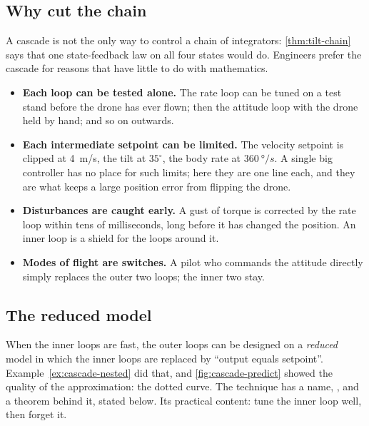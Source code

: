 \subsection{Why cut the chain}
A cascade is not the only way to control a chain of integrators: \cref{thm:tilt-chain} says that one state-feedback law on all four states would do. Engineers prefer the cascade for reasons that have little to do with mathematics.
\begin{itemize}
  \item \textbf{Each loop can be tested alone.} The rate loop can be tuned on a test stand before the drone has ever flown; then the attitude loop with the drone held by hand; and so on outwards.
  \item \textbf{Each intermediate setpoint can be limited.} The velocity setpoint is clipped at \SI{4}{m/s}, the tilt at $35^\circ$, the body rate at $\SI{360}{\degree/s}$. A single big controller has no place for such limits; here they are one line each, and they are what keeps a large position error from flipping the drone.
  \item \textbf{Disturbances are caught early.} A gust of torque is corrected by the rate loop within tens of milliseconds, long before it has changed the position. An inner loop is a shield for the loops around it.
  \item \textbf{Modes of flight are switches.} A pilot who commands the attitude directly simply replaces the outer two loops; the inner two stay.
\end{itemize}

\subsection{The reduced model}
When the inner loops are fast, the outer loops can be designed on a \emph{reduced} model in which the inner loops are replaced by \enquote{output equals setpoint}. Example~\ref{ex:cascade-nested} did that, and \cref{fig:cascade-predict} showed the quality of the approximation: the dotted curve. The technique has a name, , and a theorem behind it, stated below. Its practical content: tune the inner loop well, then forget it.

